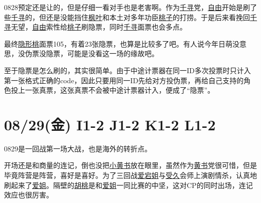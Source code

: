 0828预定还是让的，但是仔细一看对手也是老害啊。作为\uline{千寻}党，\uline{自由}开始是刷了些\uline{千寻}的，但还是没能挡住\uline{枫叶}和本土对多年功臣\uline{桃子}的打捞。于是后来看挽回\uline{千寻}无望，\uline{自由}索性给\uline{桃子}刷隐票，同时\uline{千寻}面票也会多点。

最终\uline{隐形桃}面票105，有着23张隐票，也算是比较多了吧。有人说今年日萌没意思，没伪票没隐票，可能是没看这一场的缘故吧。

至于隐票是怎么刷的，其实很简单。由于中途计票器在同一ID多次投票时只计入第一张格式正确的code，因此只要用同一ID先给对方投伪票，再给自己支持的角色投上一张真票，这张真票不会被中途计票器计入，便成了“隐票”。

\section{08/29(金) I1-2 J1-2 K1-2 L1-2}



0829是一回战第一场大战，也是海外的转折点。

开场还是和商量的连记，倒也没把\uline{小黄书}放在眼里，虽然作为\uline{黄书}党很可惜，但是毕竟阵营是阵营，喜好是喜好。为了三回战\uline{爱宕姐}与\uline{受久}会师上演剧情杀，认真地刷起来了\uline{爱姐}。隔壁的\uline{胡桃}是和\uline{爱姐}一同比赛的中坚，这对CP的同时出场，连记效应也很厉害。

